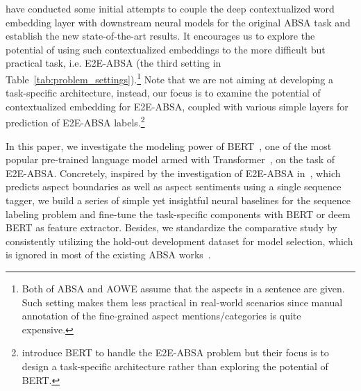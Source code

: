 \documentclass[11pt,a4paper]{article}
\begin{document}
\citet{xu-etal-2019-bert,sun-etal-2019-utilizing,song2019attentional,yu2019adapting,rietzler2019adapt,huang2019syntax,hu2019learning} have conducted some initial attempts to couple the deep contextualized word embedding layer with downstream neural models for the original ABSA task and establish the new state-of-the-art results. It encourages us to explore the potential of using such contextualized embeddings to the more difficult but practical task, i.e. E2E-ABSA (the third setting in Table~\ref{tab:problem_settings}).\footnote{Both of ABSA and AOWE assume that the aspects in a sentence are given. Such setting makes them less practical in real-world scenarios since manual annotation of the fine-grained aspect mentions/categories is quite expensive.}
Note that we are not aiming at developing a task-specific architecture, instead, our focus is to examine the potential of contextualized embedding for E2E-ABSA, coupled with various simple layers for prediction of E2E-ABSA labels.\footnote{\citet{hu-etal-2019-open} introduce BERT to handle the E2E-ABSA problem but their focus is to design a task-specific architecture rather than exploring the potential of BERT.}






In this paper, we investigate the modeling power of BERT~\cite{devlin-etal-2019-bert}, one of the most popular pre-trained language model armed with Transformer~\cite{vaswani2017attention}, on the task of E2E-ABSA. Concretely, inspired by the investigation of E2E-ABSA in~\citet{li2019unified}, which predicts aspect boundaries as well as aspect sentiments using a single sequence tagger, we build a series of simple yet insightful neural baselines for the sequence labeling problem and fine-tune the task-specific components with BERT or deem BERT as feature extractor. Besides, we standardize the comparative study by consistently utilizing the hold-out development dataset for model selection, which is ignored in most of the existing ABSA works~\cite{tay2018learning}. 
\begin{comment}
\begin{table}[]
    \centering
    \begin{tabular}{L{3cm}|L{4cm}}
    \Xhline{2\arrayrulewidth} 
        \textbf{Tag} & \textbf{Definition}  \\
        \Xhline{1.2\arrayrulewidth} 
        \texttt{B-POS/NEG/NEU} & At the beginning of aspect term with positive/negative/neutral sentiment. \\ \hline
        \texttt{I-POS/NEG/NEU} & With
    \Xhline{2\arrayrulewidth}
    \end{tabular}
    \caption{Caption}
    \label{tab:my_label}
\end{table}
\end{comment}
\end{document}

